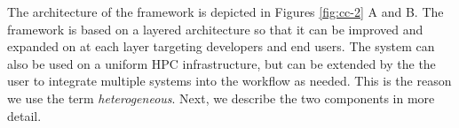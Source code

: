 \documentclass[sigconf]{acmart}
\begin{document}
The architecture of the framework is depicted in Figures \ref{fig:cc-2} A and B.  The framework is based on a layered architecture so that it can be improved and expanded on at each layer targeting developers and end users. The system can also be used on a uniform HPC infrastructure, but can be extended by the the user to integrate multiple systems into the workflow as needed. This is the reason we use the term {\em heterogeneous}. Next, we describe the two components in more detail.

\begin{figure}[htb]

\end{figure}
\end{document}
